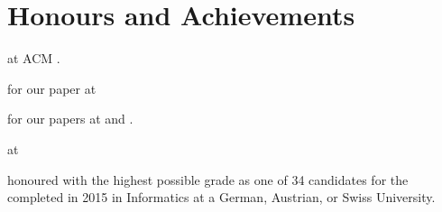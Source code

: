 \section{Honours and Achievements}
\begin{cvitemize}
    \item {} at ACM .
    \item {} for our paper at 
    \item {} for our papers at  and .
    \item {} at
        \begin{inlineItemize}
        \item {}
        \item {}
        \item {}
        \end{inlineItemize}
    \item {} honoured with the highest possible grade \newline
           as one of 34 candidates for the  completed in 2015 in Informatics at a German, Austrian, or Swiss University.
\end{cvitemize}